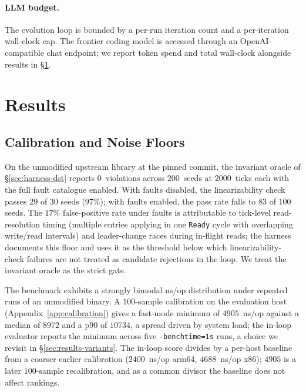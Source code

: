 \documentclass{article}
\begin{document}
\paragraph{LLM budget.}
The evolution loop is bounded by a per-run iteration count and a
per-iteration wall-clock cap. The frontier coding model is accessed
through an OpenAI-compatible chat endpoint; we report token spend
and total wall-clock alongside results in \S\ref{sec:results}.

\section{Results}
\label{sec:results}

\subsection{Calibration and Noise Floors}
On the unmodified upstream library at the pinned commit, the invariant
oracle of \S\ref{sec:harness-dst} reports $0$~violations across
$200$~seeds at $2000$~ticks each with the full fault catalogue
enabled. With faults disabled, the linearizability check passes
$29$ of $30$ seeds ($97\%$); with faults enabled, the pass rate falls
to $83$ of $100$ seeds. The $17\%$ false-positive rate under faults
is attributable to tick-level read-resolution timing (multiple
entries applying in one \texttt{Ready} cycle with overlapping
write/read intervals) and leader-change races during in-flight reads;
the harness documents this floor and uses it as the threshold below
which linearizability-check failures are not treated as candidate
rejections in the loop. We treat the invariant oracle as the strict
gate.

The benchmark exhibits a strongly bimodal ns/op distribution under
repeated runs of an unmodified binary. A $100$-sample calibration on
the evaluation host (Appendix~\ref{app:calibration}) gives a
fast-mode minimum of $4905$~ns/op against a median of $8972$ and a
p90 of $10734$, a spread driven by system load; the in-loop evaluator
reports the minimum across five \texttt{-benchtime=1s} runs, a choice
we revisit in \S\ref{sec:results-variants}. The in-loop score divides
by a per-host baseline from a coarser earlier calibration ($2400$~ns/op
arm64, $4688$~ns/op x86); $4905$ is a later $100$-sample recalibration,
and as a common divisor the baseline does not affect rankings.
\end{document}
